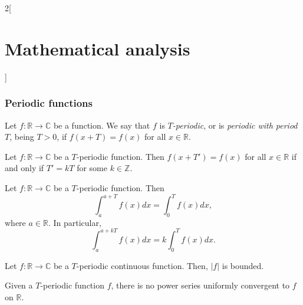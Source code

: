 \documentclass[../../../main.tex]{subfiles}
\begin{document}
\begin{multicols}{2}[\section{Mathematical analysis}]
\subsubsection*{Periodic functions}
\begin{definition}
Let $f:\mathbb{R}\rightarrow\mathbb{C}$ be a function. We say that $f$ is \textit{$T$-periodic}, or is \textit{periodic with period $T$}, being $T>0$, if $f(x+T)=f(x)$ for all $x\in\mathbb{R}$.
\end{definition}
\begin{lemma}
Let $f:\mathbb{R}\rightarrow\mathbb{C}$ be a $T$-periodic function. Then $f(x+T')=f(x)$ for all $x\in\mathbb{R}$ if and only if $T'=kT$ for some $k\in\mathbb{Z}$.
\end{lemma}
\begin{prop}
Let $f:\mathbb{R}\rightarrow\mathbb{C}$ be a $T$-periodic function. Then $$\int_a^{a+T}f(x)dx=\int_0^Tf(x)dx,$$ where $a\in\mathbb{R}$. In particular, $$\int_a^{a+kT}f(x)dx=k\int_0^Tf(x)dx.$$
\end{prop}
\begin{lemma}
Let $f:\mathbb{R}\rightarrow\mathbb{C}$ be a $T$-periodic continuous function. Then, $|f|$ is bounded.
\end{lemma}
\begin{prop}
Given a $T$-periodic function $f$, there is no power series uniformly convergent to $f$ on $\mathbb{R}$.
\end{prop}

\end{multicols}
\end{document}
